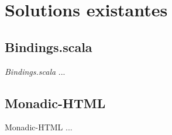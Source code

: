 \section{Solutions existantes}

\subsection{Bindings.scala}

\emph{Bindings.scala} \cite{binding.scala} ...

\subsection{Monadic-HTML}

Monadic-HTML \cite{monadic-html} ...